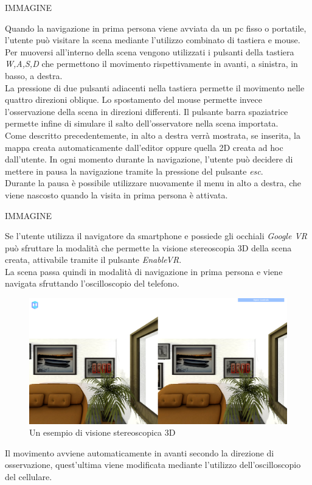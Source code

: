 IMMAGINE


Quando la navigazione in prima persona viene avviata da un pc fisso o portatile,  l’utente può visitare la scena mediante l’utilizzo combinato di tastiera e mouse.
Per muoversi all’interno della scena vengono utilizzati i pulsanti della tastiera \emph{W,A,S,D} che permettono il movimento rispettivamente in avanti, a sinistra, in basso, a destra.
\\ 
La pressione di due pulsanti adiacenti nella tastiera permette il movimento nelle quattro direzioni oblique. Lo spostamento del mouse permette invece l’osservazione della scena in direzioni differenti.
Il pulsante barra spaziatrice permette infine di simulare il salto dell’osservatore nella scena importata.
\\
Come descritto precedentemente, in alto a destra verrà mostrata, se inserita, la mappa creata automaticamente dall’editor oppure quella 2D creata ad hoc dall’utente.
In ogni momento durante la navigazione, l’utente può decidere di mettere in pausa la navigazione tramite la pressione del pulsante \emph{esc}.
\\
Durante la pausa è possibile utilizzare nuovamente il menu in alto a destra, che viene nascosto quando la visita in prima persona è attivata.

IMMAGINE


Se l’utente utilizza il navigatore da smartphone e possiede gli occhiali \emph{Google VR}  può sfruttare la modalità che permette la visione stereoscopia 3D della scena creata, attivabile tramite il pulsante \emph{EnableVR}.
\\
La scena passa quindi in modalità di navigazione in prima persona e viene navigata sfruttando l’oscilloscopio del telefono.

\begin{figure}[htb]
 \centering
 \includegraphics[width=1\linewidth]{images/chapter_caso_uso/google_vr.png}\hfill
 \caption[Esempio di visione stereoscopica 3D]{Un esempio di visione stereoscopica 3D}
 \label{fig:caso_uso_vista_alto}
\end{figure}


Il movimento avviene automaticamente in avanti secondo la direzione di osservazione, quest’ultima viene modificata mediante l’utilizzo dell’oscilloscopio del cellulare.


